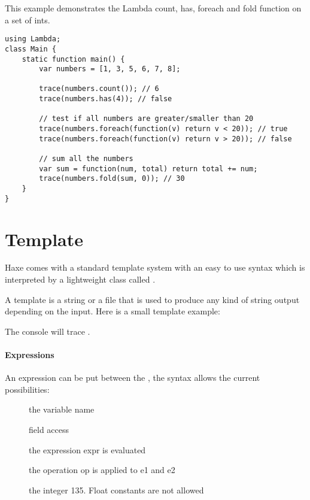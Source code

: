This example demonstrates the Lambda count, has, foreach and fold function on a set of ints.

\begin{lstlisting}
using Lambda;
class Main {
    static function main() {
        var numbers = [1, 3, 5, 6, 7, 8];
		
		trace(numbers.count()); // 6
		trace(numbers.has(4)); // false
		
        // test if all numbers are greater/smaller than 20
		trace(numbers.foreach(function(v) return v < 20)); // true
        trace(numbers.foreach(function(v) return v > 20)); // false
		
        // sum all the numbers
		var sum = function(num, total) return total += num;
		trace(numbers.fold(sum, 0)); // 30
    }
}
\end{lstlisting} 

\section{Template}
\label{std-template}

Haxe comes with a standard template system with an easy to use syntax which is interpreted by a lightweight class called .

A template is a string or a file that is used to produce any kind of string output depending on the input. Here is a small template example:


The console will trace .

\paragraph{Expressions}
An expression can be put between the \ic{::}, the syntax allows the current possibilities:

\begin{description}
	\item[] the variable name
	\item[] field access
	\item[] the expression expr is evaluated
	\item[] the operation op is applied to e1 and e2
	\item[] the integer 135. Float constants are not allowed
\end{description}

